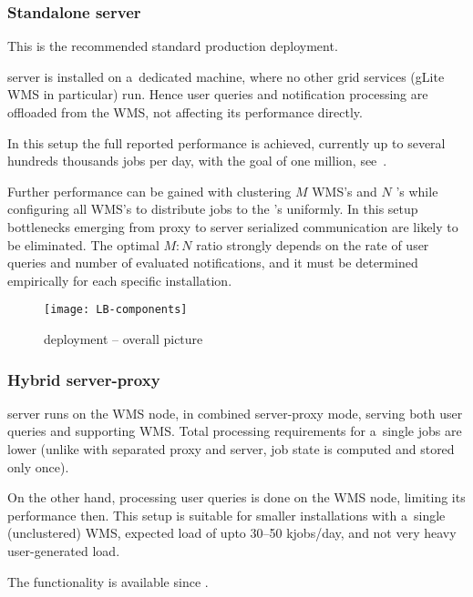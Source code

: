 

\subsubsection{Standalone \LB server}
\label{deploy-stand}

This is the recommended standard production deployment.

\LB server is installed on a~dedicated machine,
where no other grid services (gLite WMS in particular) run.
Hence user queries and notification processing are offloaded 
from the WMS, not affecting its performance directly.

In this setup the full reported performance is achieved,
currently up to several hundreds thousands jobs per day, with the goal
of one million, see~\cite{lbtp}.

Further performance can be gained with clustering $M$ WMS's and $N$ \LB's
while configuring all WMS's to distribute jobs to the \LB's uniformly.
In this setup bottlenecks emerging from \LB proxy to \LB server serialized
communication are likely to be eliminated.
The optimal $M:N$ ratio strongly depends on the rate of user queries
and number of evaluated notifications,
and it must be determined empirically for each specific installation.

\begin{figure}[ht]
\centering
\texttt{[image: LB-components]}
\caption{\LB deployment -- overall picture} 
\label{f:comp}
\end{figure}


\subsubsection{Hybrid \LB server-proxy}
\label{deploy-hybrid}

\LB server runs on the WMS node, in combined server-proxy mode,
serving both user queries and supporting WMS.
Total processing requirements for a~single jobs are lower
(unlike with separated proxy and server, job state is computed and stored only once).

On the other hand, processing user queries is done on the WMS node,
limiting its performance then.
This setup is suitable for smaller installations with a~single (unclustered)
WMS, expected load of upto 30--50 kjobs/day, and not very heavy user-generated
load.

The functionality is available since .

